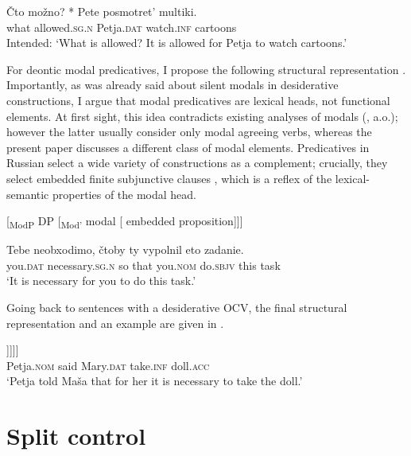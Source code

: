 \documentclass[output=paper,
colorlinks,
citecolor=brown,
newtxmath
]{langscibook}
\begin{document}
\ea \label{ex23} 
\gll Čto možno? *\hspace{-2pt} Pete posmotret’ multiki.\\ 
    what allowed.\textsc{sg.n} {} Petja.\textsc{dat} watch.\textsc{inf} cartoons\\
\glt Intended: `What is allowed? It is allowed for Petja to watch cartoons.'
\z

\noindent For deontic modal predicatives, I propose the following structural representation . Importantly, as was already said about silent modals in desiderative constructions, I argue that modal predicatives are lexical heads, not functional elements. At first sight, this idea contradicts existing analyses of modals (\citealt{Cinque1999,W1999}, a.o.); however the latter usually consider only modal agreeing verbs, whereas the present paper discusses a different class of modal elements. Predicatives in Russian select a wide variety of constructions as a complement; crucially, they select embedded finite subjunctive clauses , which is a reflex of the lexical-semantic properties of the modal head. 

\begin{exe}
\ex\label{ex24} 
{[\textsubscript{ModP} DP [\textsubscript{Mod$’$} modal [\hspace{-2pt} embedded proposition]]]}
\end{exe}

\ea\label{ex25}
\gll Tebe neobxodimo, čtoby ty vypolnil eto zadanie.\\ 
    you.\textsc{dat} necessary.\textsc{sg.n} {so that} you.\textsc{nom} do.\textsc{sbjv} this task\\
\glt `It is necessary for you to do this task.'
\z

\noindent Going back to sentences with a desiderative OCV, the final structural representation and an example are given in .

\ea\label{ex26} 
\gll [\textsubscript{\textit{v}P} Petja [\textsubscript{VP} [\textsubscript{V} skazal][\textsubscript{ModP} [\hspace{-2pt} Maše$_i$ ][\textsubscript{Mod$'$} modal [\textsubscript{CP} PRO$_i$ vzjat’ kuklu ]]]]]\\
    {}  Petja.\textsc{nom}   {}  {}  said {} Mary.\textsc{dat}  {} {}  {}  {}  take.\textsc{inf}    doll.\textsc{acc} {}\\
\glt `Petja told Maša that for her it is necessary to take the doll.'
\z

\section{Split control}\label{s4}
\end{document}
